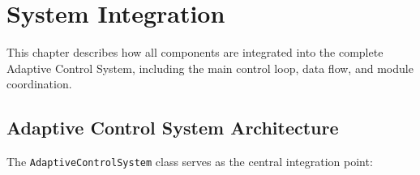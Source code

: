 
\chapter{System Integration}
\label{ch:integration}

This chapter describes how all components are integrated into the complete Adaptive Control System, including the main control loop, data flow, and module coordination.

\section{Adaptive Control System Architecture}

The \texttt{AdaptiveControlSystem} class serves as the central integration point:

